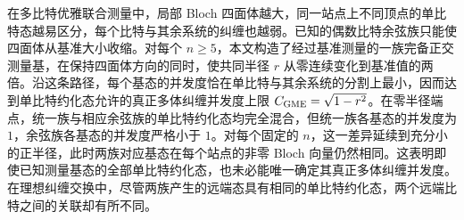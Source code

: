 在多比特优雅联合测量中，局部 Bloch 四面体越大，同一站点上不同顶点的单比特态越易区分，每个比特与其余系统的纠缠也越弱。已知的偶数比特余弦族只能使四面体从基准大小收缩。对每个 $n\ge5$，本文构造了经过基准测量的一族完备正交测量基，在保持四面体方向的同时，使共同半径 $r$ 从零连续变化到基准值的两倍。沿这条路径，每个基态的并发度恰在单比特与其余系统的分割上最小，因而达到单比特约化态允许的真正多体纠缠并发度上限 $C_{\rm GME}=\sqrt{1-r^2}$。在零半径端点，统一族与相应余弦族的单比特约化态均完全混合，但统一族各基态的并发度为 $1$，余弦族各基态的并发度严格小于 $1$。对每个固定的 $n$，这一差异延续到充分小的正半径，此时两族对应基态在每个站点的非零 Bloch 向量仍然相同。这表明即使已知测量基态的全部单比特约化态，也未必能唯一确定其真正多体纠缠并发度。在理想纠缠交换中，尽管两族产生的远端态具有相同的单比特约化态，两个远端比特之间的关联却有所不同。
